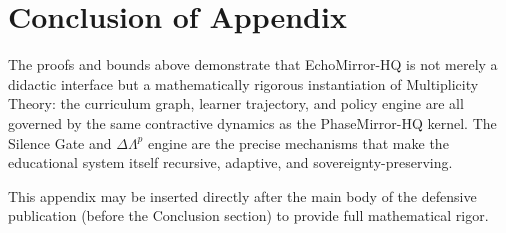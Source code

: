 \documentclass[11pt,letterpaper]{article}
\begin{document}
\section{Conclusion of Appendix}
The proofs and bounds above demonstrate that EchoMirror-HQ is not merely a didactic interface but a mathematically rigorous instantiation of Multiplicity Theory: the curriculum graph, learner trajectory, and policy engine are all governed by the same contractive dynamics as the PhaseMirror-HQ kernel. The Silence Gate and $\Delta\Lambda^p$ engine are the precise mechanisms that make the educational system itself recursive, adaptive, and sovereignty-preserving.

This appendix may be inserted directly after the main body of the defensive publication (before the Conclusion section) to provide full mathematical rigor.
\nocite{*}
  

\end{document}
